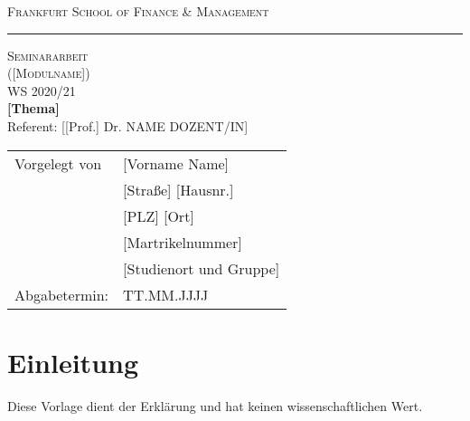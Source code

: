 \documentclass[12pt,a4paper]{article}
\begin{document}
\thispagestyle{empty}
\vspace*{-3cm}
\begin{center}
\large \textsc{Frankfurt School of Finance \& Management}
\vspace{0.5cm}
\hrule
\vspace{5.5cm}
{\Large \textsc{Seminararbeit\\
([Modulname])}}\\
{\large WS 2020/21}\\
\vspace{1cm}
{\Large \bf
[Thema]}\\
\vspace*{1cm}
{\large Referent:  [[Prof.] Dr. NAME DOZENT/IN]}
\end{center}
\vspace*{5cm}
{\large

\hspace*{7cm}
\parbox{8.2cm}
{
\begin{tabular}{ll}
Vorgelegt von & [Vorname Name]\\

 & [Straße] [Hausnr.]\\
 & [PLZ] [Ort]\bigskip\\
 & [Martrikelnummer]\bigskip\\
 & [Studienort und Gruppe]\bigskip\\
Abgabetermin: & TT.MM.JJJJ

\end{tabular}}}

\newpage
{}
\tableofcontents

\newpage
{} %
\listoftables

\newpage
{} %
\listoffigures

\newpage
{}
\section{Einleitung}\label{intro}
Diese Vorlage dient der Erklärung und hat keinen wissenschaftlichen Wert.
\end{document}

